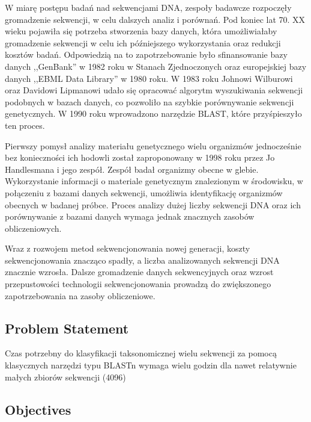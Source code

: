 \documentclass{article}
\newcommand{\temporary}[1]{
    \begin{tcolorbox}[colframe=red, colback=white, title={\textbf{WERSJA PO POLSKU}}, sharp corners=south]
        #1
    \end{tcolorbox}
}
\begin{document}
{    W miarę postępu badań nad sekwencjami DNA, zespoły badawcze rozpoczęły gromadzenie sekwencji, w celu dalszych analiz i porównań. Pod koniec lat 70. XX wieku pojawiła się potrzeba stworzenia bazy danych, która umożliwiałaby gromadzenie sekwencji w celu ich późniejszego wykorzystania oraz redukcji kosztów badań. Odpowiedzią na to zapotrzebowanie było sfinansowanie bazy danych ,,GenBank'' w 1982 roku w Stanach Zjednoczonych\cite{Bilofsky:1986} oraz europejskiej bazy danych ,,EBML Data Library'' w 1980 roku\cite{Higgins:1992}. W 1983 roku Johnowi Wilburowi oraz Davidowi Lipmanowi udało się opracować algorytm wyszukiwania sekwencji podobnych w bazach danych\cite{Wilbur:1983}, co pozwoliło na szybkie porównywanie sekwencji genetycznych. W 1990 roku wprowadzono narzędzie BLAST\cite{Altschul:1990}, które przyśpieszyło ten proces.

    Pierwszy pomysł analizy materiału genetycznego wielu organizmów jednocześnie bez konieczności ich hodowli został zaproponowany w 1998 roku przez Jo Handlesmana i jego zespół\cite{Handelsman:1998}. Zespół badał organizmy obecne w glebie. Wykorzystanie informacji o materiale genetycznym znalezionym w środowisku, w połączeniu z bazami danych sekwencji, umożliwia  identyfikację organizmów obecnych w badanej próbce. Proces analizy dużej liczby sekwencji DNA oraz ich porównywanie z bazami danych wymaga jednak znacznych zasobów obliczeniowych.

    Wraz z rozwojem metod sekwencjonowania nowej generacji\cite{Reinartz:2002}, koszty sekwencjonowania znacząco spadły, a liczba analizowanych sekwencji DNA znacznie wzrosła\cite{Muir:2016}. Dalsze gromadzenie danych sekwencyjnych oraz wzrost przepustowości technologii sekwencjonowania prowadzą do zwiększonego zapotrzebowania na zasoby obliczeniowe.
            }
        
        \subsection{Problem Statement}

            \temporary{
                Czas potrzebny do klasyfikacji taksonomicznej wielu sekwencji za pomocą klasycznych narzędzi typu BLASTn wymaga wielu godzin dla nawet relatywnie małych zbiorów sekwencji (4096)
            }

        \subsection{Objectives}
\end{document}
